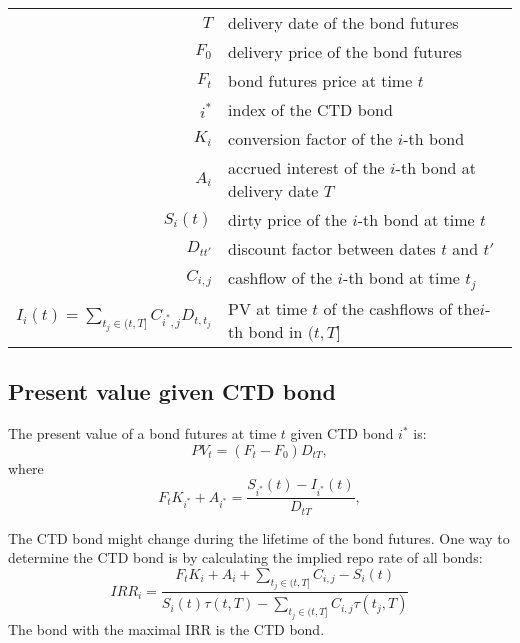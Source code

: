 \begin{itemize}
\begin{table*}
\begin{tabular}{r | l}
\hline\hline
$T$ & delivery date of the bond futures \\
$F_0$ & delivery price of the bond futures \\
$F_t$ & bond futures price at time $t$ \\
$i^*$ & index of the CTD bond \\
$K_{i}$ & conversion factor of the $i$-th bond \\
$A_{i}$ & accrued interest of the $i$-th bond at delivery date $T$\\
$S_i(t)$ & dirty price of the $i$-th bond at time $t$ \\
$D_{t t'}$ & discount factor between dates $t$ and $t'$ \\
$C_{i,j}$ & cashflow of the $i$-th bond at time $t_j$ \\
$I_i(t)=\sum_{t_j\in(t,T]} C_{i^*,j} D_{t,t_j}$ & PV at time $t$ of the 
		cashflows of the$i$-th bond in $(t,T]$ \\
\hline
\end{tabular}
\end{table*}

\subsection{Present value given CTD bond}

The present value of a bond futures at time $t$ given CTD bond $i^*$ is:
\begin{equation}
  PV_t = (F_t - F_0) D_{tT},
\end{equation}
where
\begin{equation}
  F_t K_{i^*} + A_{i^*} = \frac{S_{i^*}(t) - I_{i^*}(t) }{ D_{tT} },
\end{equation}

The CTD bond might change during the lifetime of the bond futures. One way to
determine the CTD bond is by calculating the implied repo rate of all bonds:
\begin{equation}
  IRR_i = \frac{ F_t K_i + A_i + \sum_{t_j\in(t,T]} C_{i,j} - S_i(t) }
               { S_i(t) \tau(t,T) - \sum_{t_j\in(t,T]} C_{i,j} \tau(t_j,T) }
\end{equation}
The bond with the maximal IRR is the CTD bond.



\end{itemize}
